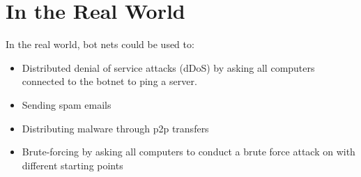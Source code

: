 \documentclass[9pt,a4paper]{article}
\begin{document}
\section{In the Real World}
In the real world, bot nets could be used to:
\begin{itemize}
\item Distributed denial of service attacks (dDoS) by asking all computers connected to the botnet to ping a server.
\item Sending spam emails
\item Distributing malware through p2p transfers
\item Brute-forcing by asking all computers to conduct a brute force attack on with different starting points
\end{itemize}
\end{document}
